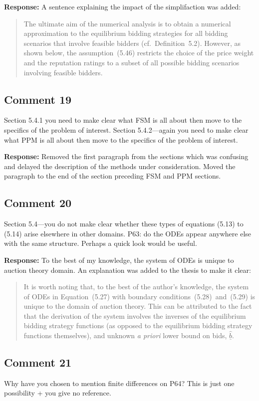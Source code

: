 \documentclass[10pt,a4paper,notitlepage]{article}
\numberwithin{equation}{section}
\begin{document}
\textbf{Response:}
A sentence explaining the impact of the simplifaction was added:
\begin{quote}
The ultimate aim of the numerical analysis is to obtain a numerical approximation to the equilibrium bidding strategies for all bidding scenarios that involve feasible bidders (cf.~Definition~5.2). However, as shown below, the assumption~(5.46) restricts the choice of the price weight and the reputation ratings to a subset of all possible bidding scenarios involving feasible bidders.
\end{quote}

\subsection{Comment 19}
Section 5.4.1 you need to make clear what FSM is all about then move to the specifics of the problem of interest. Section 5.4.2---again you need to make clear what PPM is all about then move to the specifics of the problem of interest.

\textbf{Response:}
Removed the first paragraph from the sections which was confusing and delayed the description of the methods under consideration. Moved the paragraph to the end of the section preceding FSM and PPM sections.

\subsection{Comment 20}
Section 5.4---you do not make clear whether these types of equations (5.13) to (5.14) arise elsewhere in other domains. P63: do the ODEs appear anywhere else with the same structure. Perhaps a quick look would be useful.

\textbf{Response:}
To the best of my knowledge, the system of ODEs is unique to auction theory domain. An explanation was added to the thesis to make it clear:
\begin{quote}
It is worth noting that, to the best of the author's knowledge, the system of ODEs in Equation~(5.27) with boundary conditions~(5.28)~and~(5.29) is unique to the domain of auction theory. This can be attributed to the fact that the derivation of the system involves the inverses of the equilibrium bidding strategy functions (as opposed to the equilibrium bidding strategy functions themselves), and unknown \emph{a priori} lower bound on bids, $\underline{\hat{b}}$.
\end{quote}

\subsection{Comment 21}
Why have you chosen to mention finite differences on P64? This is just one possibility + you give no reference. 
\end{document}

